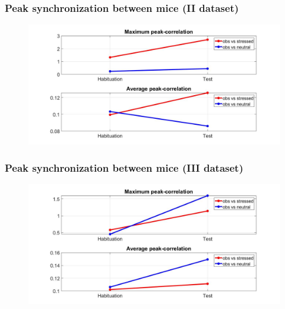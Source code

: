 \documentclass{beamer}
\begin{document}
\begin{frame}
\frametitle{Peak synchronization between mice (II dataset)}


\begin{figure}[H]
	\begin{center}
		\hspace*{-1.3cm}
		\includegraphics[scale=.30]{peak_synch2.jpg} 
	\end{center}  
	
	
\end{figure}

\end{frame}

\begin{frame}
\frametitle{Peak synchronization between mice (III dataset)}


\begin{figure}[H]
	\begin{center}
		\hspace*{-1.3cm}
		\includegraphics[scale=.30]{peak_synch3.jpg} 
	\end{center}  
	
	
\end{figure}

\end{frame}
\end{document}

